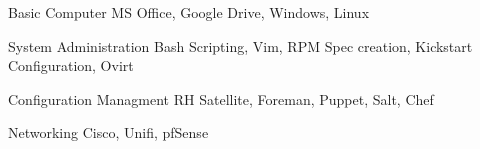 

\begin{cvskills}

  \cvskill
    {Basic Computer} %
    {MS Office, Google Drive, Windows, Linux} %

  \cvskill
    {System Administration} %
    {Bash Scripting, Vim, RPM Spec creation, Kickstart Configuration, Ovirt } %

  \cvskill
    {Configuration Managment} %
    {RH Satellite, Foreman, Puppet, Salt, Chef} %

  \cvskill
    {Networking} %
    {Cisco, Unifi, pfSense} %

\end{cvskills}
